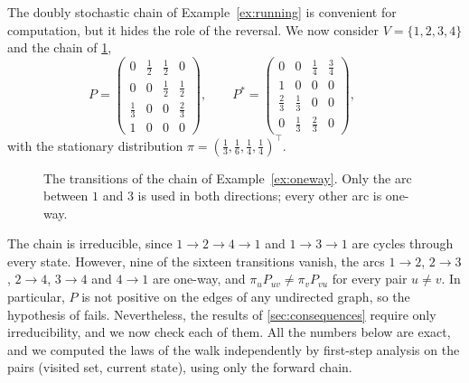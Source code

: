 \documentclass[onefignum,onetabnum,nohypdvips]{siamart250211}
\numberwithin{theorem}{section}
\numberwithin{equation}{section}
\begin{document}
\begin{example}\label{ex:oneway}
The doubly stochastic chain of Example~\ref{ex:running} is convenient for
computation, but it hides the role of the reversal. We now consider $V=\{1,2,3,4\}$ and the chain of \cref{fig:sm-oneway},
\[
P=\begin{pmatrix}
0&\tfrac12&\tfrac12&0\\
0&0&\tfrac12&\tfrac12\\
\tfrac13&0&0&\tfrac23\\
1&0&0&0
\end{pmatrix},
\qquad
P^{*}=\begin{pmatrix}
0&0&\tfrac14&\tfrac34\\
1&0&0&0\\
\tfrac23&\tfrac13&0&0\\
0&\tfrac13&\tfrac23&0
\end{pmatrix},
\qquad
\]
with the stationary distribution
$\pi=(\tfrac13,\tfrac16,\tfrac14,\tfrac14)^{\top}$.


\begin{figure}[H]
\centering
{}
\caption{The transitions of the chain of Example~\ref{ex:oneway}. Only the
arc between $1$ and $3$ is used in both directions; every other arc is
one-way.}
\label{fig:sm-oneway}
\end{figure}

The chain is irreducible, since $1\to2\to4\to1$ and $1\to3\to1$ are
cycles through every state. However, nine of the sixteen transitions
vanish, the arcs $1\to2$, $2\to3$, $2\to4$, $3\to4$ and $4\to1$ are
one-way, and $\pi_uP_{uv}\ne\pi_vP_{vu}$ for every pair $u\ne v$. In
particular, $P$ is not positive on the edges of any undirected graph,
so the hypothesis of \cite{FredesMarckert2023} fails. Nevertheless,
the results of \cref{sec:consequences} require only irreducibility,
and we now check each of them. All the numbers below are exact, and we
computed the laws of the walk independently by first-step analysis on
the pairs (visited set, current state), using only the forward chain.


\end{example}
\end{document}
